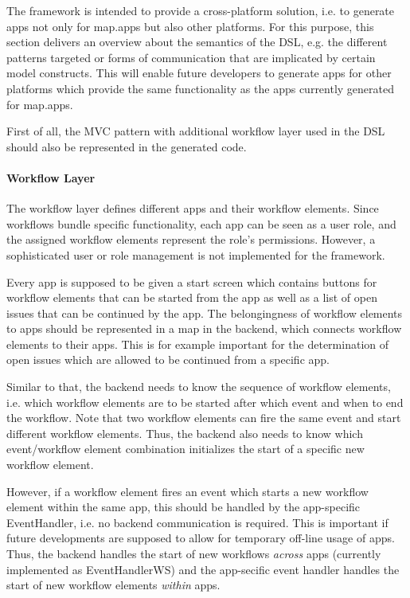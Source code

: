 
The \MD framework is intended to provide a cross-platform solution, i.e. to generate apps not only for map.apps but also other platforms. For this purpose, this section delivers an overview about the semantics of the DSL, e.g. the different patterns targeted or forms of communication that are implicated by certain model constructs. This will enable future developers to generate apps for other platforms which provide the same functionality as the apps currently generated for map.apps.

First of all, the MVC pattern with additional workflow layer used in the DSL should also be represented in the generated code.

\paragraph*{Workflow Layer}
The workflow layer defines different apps and their workflow elements. Since workflows bundle specific functionality, each app can be seen as a user role, and the assigned workflow elements represent the role's permissions. However, a sophisticated user or role management is not implemented for the \MD framework.

Every app is supposed to be given a start screen which contains buttons for workflow elements that can be started from the app as well as a list of open issues that can be continued by the app. The belongingness of workflow elements to apps should be represented in a map in the backend, which connects workflow elements to their apps. This is for example important for the determination of open issues which are allowed to be continued from a specific app.

Similar to that, the backend needs to know the sequence of workflow elements, i.e. which workflow elements are to be started after which event and when to end the workflow. Note that two workflow elements can fire the same event and start different workflow elements. Thus, the backend also needs to know which event/workflow element combination initializes the start of a specific new workflow element.

However, if a workflow element fires an event which starts a new workflow element within the same app, this should be handled by the app-specific EventHandler, i.e. no backend communication is required. This is important if future developments are supposed to allow for temporary off-line usage of apps. Thus, the backend handles the start of new workflows \textit{across} apps (currently implemented as EventHandlerWS) and the app-secific event handler handles the start of new workflow elements \textit{within} apps.

